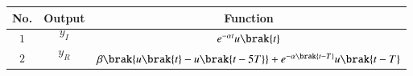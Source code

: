\begin{tabular}{|c|c|c|}
	\hline
	\textbf{No.} & \textbf{Output} & \textbf{Function}\\[6pt]
	\hline
	$1$ & $$y_I$$  & $e^{- \alpha t} u\brak{t}$\\[2pt]
	\hline
	$2$ & $$y_R$$ & $\beta \brak{ u\brak{t} - u\brak{t-5T}} + e^{- \alpha \brak{t - T}} u\brak{t-T}$\\[2pt]
	\hline
\end{tabular}